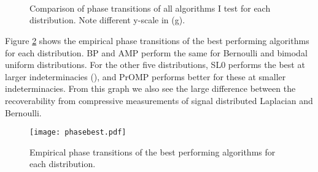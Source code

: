 \documentclass[11pt,draftcls,onecolumn]{IEEEtran}
\begin{document}
\begin{figure}[htb]
\centering
{}\hspace{-0.1in}
\\ \vspace{-0.1in}

\hspace{-0.1in} 
\\ \vspace{-0.1in}

\hspace{-0.1in}
\\ \vspace{-0.1in}


\caption{Comparison of phase transitions of
all algorithms I test for each distribution.
Note different y-scale in (g).}
\label{fig:phasevsalgorithms}
\end{figure}

Figure \ref{fig:bestphase} shows the empirical phase transitions
of the best performing algorithms for each distribution.
BP and AMP perform the same for Bernoulli and bimodal uniform distributions.
For the other five distributions,
SL0 performs the best at larger indeterminacies (),
and PrOMP performs better for these at smaller indeterminacies.
From this graph we also see the large difference
between the recoverability from compressive measurements
of signal distributed Laplacian and Bernoulli.

\begin{figure}[htb]
\centering
\texttt{[image: phasebest.pdf]}
\caption{Empirical phase transitions of the best performing algorithms
for each distribution.}
\label{fig:bestphase}
\end{figure}

\clearpage
\end{document}
